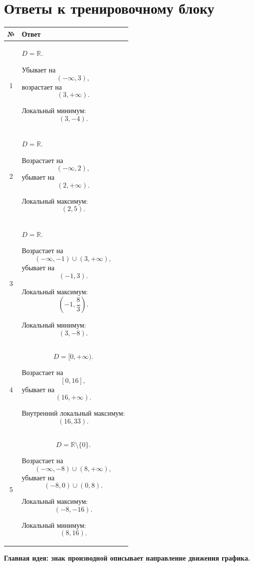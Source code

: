 \documentclass[a4paper,12pt]{article}
\newcommand{\R}{\mathbb{R}}
\begin{document}
\section*{Ответы к тренировочному блоку}

\small

\begin{tabularx}{\linewidth}{@{}c X@{}}

\toprule

\textbf{№}
&
\textbf{Ответ}
\\

\midrule

1
&
\(D=\R\).

Убывает на
\[
(-\infty,3),
\]
возрастает на
\[
(3,+\infty).
\]

Локальный минимум:
\[
(3,-4).
\]
\\

\addlinespace

2
&
\(D=\R\).

Возрастает на
\[
(-\infty,2),
\]
убывает на
\[
(2,+\infty).
\]

Локальный максимум:
\[
(2,5).
\]
\\

\addlinespace

3
&
\(D=\R\).

Возрастает на
\[
(-\infty,-1)\cup(3,+\infty),
\]
убывает на
\[
(-1,3).
\]

Локальный максимум:
\[
\left(-1,\frac83\right).
\]

Локальный минимум:
\[
(3,-8).
\]
\\

\addlinespace

4
&
\[
D=[0,+\infty).
\]

Возрастает на
\[
[0,16],
\]
убывает на
\[
(16,+\infty).
\]

Внутренний локальный максимум:
\[
(16,33).
\]
\\

\addlinespace

5
&
\[
D=\R\setminus\{0\}.
\]

Возрастает на
\[
(-\infty,-8)\cup(8,+\infty),
\]
убывает на
\[
(-8,0)\cup(0,8).
\]

Локальный максимум:
\[
(-8,-16).
\]

Локальный минимум:
\[
(8,16).
\]
\\

\bottomrule

\end{tabularx}

\normalsize

\vfill

\begin{center}
\textcolor{darkaccent}{
\textbf{
Главная идея:
знак производной описывает направление движения графика.
}
}
\end{center}
\end{document}
